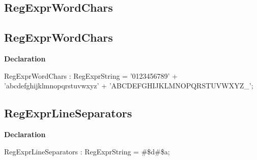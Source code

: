 \documentclass{report}
\newif\ifpdf
\begin{document}
\subsection*{\large{\textbf{RegExprWordChars}}\normalsize\hspace{1ex}\hrulefill}
\else
\subsection*{RegExprWordChars}
\fi
\label{RegExpr-RegExprWordChars}
\begin{list}{}{
\setlength{\itemindent}{0cm}
\setlength{\listparindent}{0cm}
\setlength{\leftmargin}{\evensidemargin}
\addtolength{\leftmargin}{\tmplength}
\settowidth{\labelsep}{X}
\addtolength{\leftmargin}{\labelsep}
\setlength{\labelwidth}{\tmplength}
}
\item[\textbf{Declaration}\hfill]
\ifpdf
\begin{flushleft}
\fi
\begin{ttfamily}
RegExprWordChars : RegExprString =         '0123456789'   + 'abcdefghijklmnopqrstuvwxyz'
  + 'ABCDEFGHIJKLMNOPQRSTUVWXYZ{\_}';\end{ttfamily}

\ifpdf
\end{flushleft}
\fi

\end{list}
\ifpdf
\subsection*{\large{\textbf{RegExprLineSeparators}}\normalsize\hspace{1ex}\hrulefill}
\else
\subsection*{RegExprLineSeparators}
\fi
\label{RegExpr-RegExprLineSeparators}
\begin{list}{}{
\setlength{\itemindent}{0cm}
\setlength{\listparindent}{0cm}
\setlength{\leftmargin}{\evensidemargin}
\addtolength{\leftmargin}{\tmplength}
\settowidth{\labelsep}{X}
\addtolength{\leftmargin}{\labelsep}
\setlength{\labelwidth}{\tmplength}
}
\item[\textbf{Declaration}\hfill]
\ifpdf
\begin{flushleft}
\fi
\begin{ttfamily}
RegExprLineSeparators : RegExprString =   {\#}{\$}d{\#}{\$}a;\end{ttfamily}

\ifpdf
\end{flushleft}
\fi

\end{list}
\ifpdf
\end{document}
